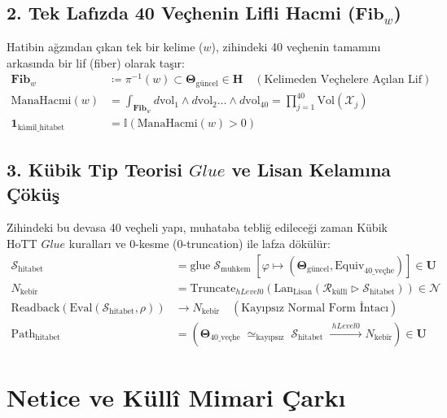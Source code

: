 \documentclass[11pt, a4paper]{article}
\begin{document}
\subsection{2. Tek Lafızda 40 Veçhenin Lifli Hacmi ($\mathbf{Fib}_w$)}
Hatibin ağzından çıkan tek bir kelime ($w$), zihindeki 40 veçhenin tamamını arkasında bir lif (fiber) olarak taşır:
\begin{align}
\mathbf{Fib}_w &\coloneqq \pi^{-1}(w) \subset \mathbf{\Theta}_{\text{güncel}} \in \mathbf{H} \quad (\text{Kelimeden Veçhelere Açılan Lif}) \\
\text{ManaHacmi}(w) &= \int_{\mathbf{Fib}_w} d\text{vol}_{1} \wedge d\text{vol}_{2} \dots \wedge d\text{vol}_{40} = \prod_{j=1}^{40} \text{Vol}(\mathcal{X}_j) \\
\mathbf{1}_{\text{kâmil\_hitabet}} &= \mathbb{I}\left( \text{ManaHacmi}(w) > 0 \right)
\end{align}

\subsection{3. Kübik Tip Teorisi $Glue$ ve Lisan Kelamına Çöküş}
Zihindeki bu devasa 40 veçheli yapı, muhataba tebliğ edileceği zaman Kübik HoTT $Glue$ kuralları ve $0$-kesme ($0$-truncation) ile lafza dökülür:
\begin{align}
\mathcal{S}_{\text{hitabet}} &= \text{glue} \; \mathcal{S}_{\text{muhkem}} \; \left[ \varphi \mapsto (\mathbf{\Theta}_{\text{güncel}}, \text{Equiv}_{\text{40\_veçhe}}) \right] \in \mathbf{U} \\
N_{\text{kebîr}} &= \text{Truncate}_{hLevel 0} \left( \text{Lan}_{\text{Lisan}} \left( \mathcal{R}_{\text{küllî}} \triangleright \mathcal{S}_{\text{hitabet}} \right) \right) \in \mathcal{N} \\
\text{Readback}\left( \text{Eval}(\mathcal{S}_{\text{hitabet}}, \rho) \right) &\longrightarrow N_{\text{kebîr}} \quad (\text{Kayıpsız Normal Form İntacı}) \\
\text{Path}_{\text{hitabet}} &= \left( \mathbf{\Theta}_{\text{40\_veçhe}} \;\simeq_{\text{kayıpsız}}\; \mathcal{S}_{\text{hitabet}} \;\xrightarrow{\;hLevel 0\;} N_{\text{kebîr}} \right) \in \mathbf{U}
\end{align}

\section{Netice ve Küllî Mimari Çarkı}
\end{document}

